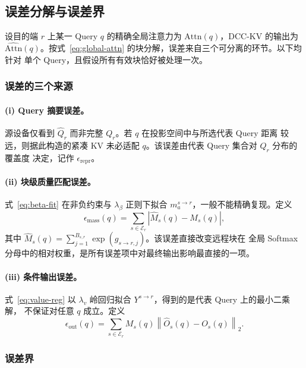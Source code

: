 \subsection{误差分解与误差界}
\label{sec:analysis-error}

设目的端 $r$ 上某一 Query $q$ 的精确全局注意力为 $\mathrm{Attn}(q)$，DCC-KV 的输出为
$\widehat{\mathrm{Attn}}(q)$。按式~\eqref{eq:global-attn} 的块分解，误差来自三个可分离的环节。以下均针对
单个 Query，且假设所有有效块恰好被处理一次。

\subsubsection{误差的三个来源}

\paragraph{(i) Query 摘要误差。}
源设备仅看到 $\widehat{Q}_r$ 而非完整 $Q_r$。若 $q$ 在投影空间中与所选代表 Query 距离
较远，则据此构造的紧凑 KV 未必适配 $q$。该误差由代表 Query 集合对 $Q_r$ 分布的覆盖度
决定，记作 $\epsilon_{\text{repr}}$。

\paragraph{(ii) 块级质量匹配误差。}
式~\eqref{eq:beta-fit} 在非负约束与 $\lambda_\beta$ 正则下拟合 $m_a^{s\to r}$，一般不能精确复现。定义
\begin{equation}
\label{eq:err-mass}
\epsilon_{\text{mass}}(q) = \sum_{s \in \mathcal{E}_r}
\left| \widehat{M}_s(q) - M_s(q) \right| ,
\end{equation}
其中 $\widehat{M}_s(q) = \sum_{j=1}^{B_{s,r}} \exp(g_{s\to r,j})$。该误差直接改变远程块在
全局 Softmax 分母中的相对权重，是所有误差项中对最终输出影响最直接的一项。

\paragraph{(iii) 条件输出误差。}
式~\eqref{eq:value-reg} 以 $\lambda_v$ 岭回归拟合 $Y^{s \to r}$，得到的是代表 Query 上的最小二乘解，
不保证对任意 $q$ 成立。定义
\begin{equation}
\label{eq:err-out}
\epsilon_{\text{out}}(q) = \sum_{s \in \mathcal{E}_r}
M_s(q) \left\| \widehat{O}_s(q) - O_s(q) \right\|_2 .
\end{equation}

\subsubsection{误差界}

